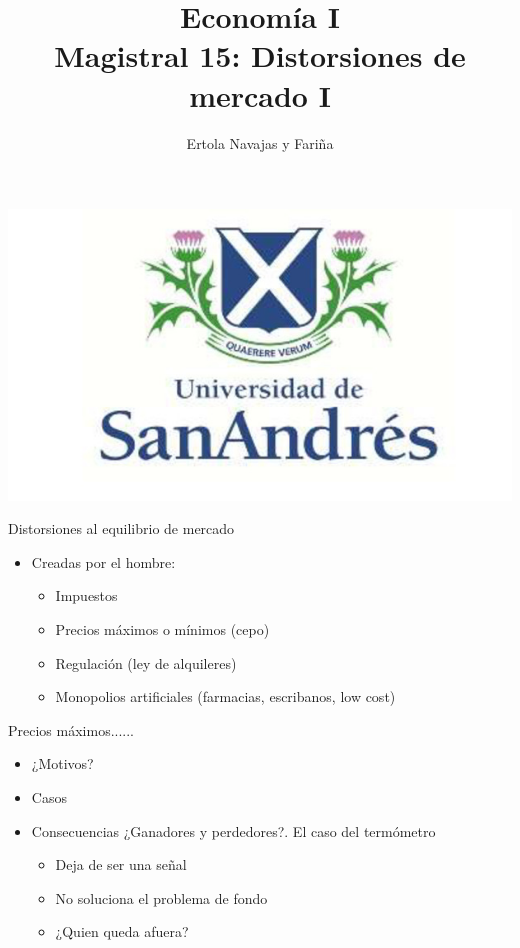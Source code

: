 \documentclass{beamer}
\title[Economía I]{Economía I \vspace{4mm}
\\ Magistral 15: Distorsiones de mercado I}
\date{}
\author[Ertola Navajas y Fariña]{Ertola Navajas y Fariña}
\institute[]{Universidad de San Andrés}
\begin{document}
\begin{frame}
\titlepage
\centering
\includegraphics[scale=0.2]{../Figures/logoUDESA.jpg} 
\end{frame}

\begin{frame}{Distorsiones al equilibrio de mercado}
    \begin{itemize}
        \item Creadas por el hombre:
        \begin{itemize}
            \item Impuestos
             \vspace{1mm}
            \item Precios máximos o mínimos (cepo)
             \vspace{1mm}
            \item Regulación (ley de alquileres)
            \vspace{1mm}
            \item Monopolios artificiales (farmacias, escribanos, low cost)
        \end{itemize}
    \end{itemize}
\end{frame}

\begin{frame}{Precios máximos......}
\begin{itemize}
    \item ¿Motivos?
    \item Casos
    \item Consecuencias ¿Ganadores y perdedores?. El caso del termómetro
    \begin{itemize}
        \item Deja de ser una señal
        \item No soluciona el problema de fondo
        \item ¿Quien queda afuera?
    \end{itemize}
\end{itemize}
\end{frame}
\end{document}
